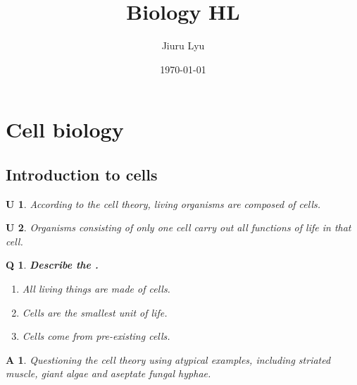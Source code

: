 \documentclass[12pt, a4paper]{article}
\title{\textbf{Biology HL}}
\author{Jiuru Lyu}
\date{\today}
\newtheorem{und}{U}[subsection]
\newtheorem{app}{A}[subsection]
\newtheorem{que}{Q}[subsection]
\begin{document}
\maketitle
\tableofcontents

\newpage

\section{Cell biology}
\subsection{Introduction to cells}
\begin{und}
    According to the cell theory, living organisms are composed of cells.
\end{und}
\begin{und}
    Organisms consisting of only one cell carry out all functions of life in that cell.
\end{und}
\begin{tcolorbox}\begin{que}
    \textbf{Describe the \color{red}{cell theory}.}
        \begin{enumerate}
            \item All living things are made of cells.
            \item Cells are the smallest unit of life.
            \item Cells come from pre-existing cells.
        \end{enumerate}
\end{que}\end{tcolorbox}
\begin{app}
    Questioning the cell theory using atypical examples, including striated muscle, giant algae and aseptate fungal hyphae.
\end{app}
\end{document}
